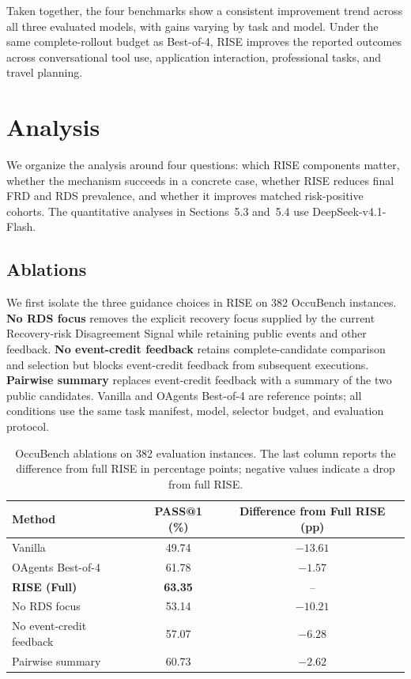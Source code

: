 \documentclass{article}
\begin{document}
Taken together, the four benchmarks show a consistent improvement trend across all three evaluated models, with gains varying by task and model. Under the same complete-rollout budget as Best-of-4, RISE improves the reported outcomes across conversational tool use, application interaction, professional tasks, and travel planning.

\section{Analysis}
We organize the analysis around four questions: which RISE components matter, whether the mechanism succeeds in a concrete case, whether RISE reduces final FRD and RDS prevalence, and whether it improves matched risk-positive cohorts. The quantitative analyses in Sections~5.3 and~5.4 use DeepSeek-v4.1-Flash.

\subsection{Ablations}
We first isolate the three guidance choices in RISE on 382 OccuBench instances. \textbf{No RDS focus} removes the explicit recovery focus supplied by the current Recovery-risk Disagreement Signal while retaining public events and other feedback. \textbf{No event-credit feedback} retains complete-candidate comparison and selection but blocks event-credit feedback from subsequent executions. \textbf{Pairwise summary} replaces event-credit feedback with a summary of the two public candidates. Vanilla and OAgents Best-of-4 are reference points; all conditions use the same task manifest, model, selector budget, and evaluation protocol.

\begin{table}[!htb]
\caption{OccuBench ablations on 382 evaluation instances. The last column reports the difference from full RISE in percentage points; negative values indicate a drop from full RISE.}
\label{tab:ablations}
\centering
\small
\begin{tabular}{lcc}
\toprule
Method & PASS@1 (\%) & Difference from Full RISE (pp) \\
\midrule
Vanilla & 49.74 & $-13.61$ \\
OAgents Best-of-4 & 61.78 & $-1.57$ \\
\textbf{RISE (Full)} & \textbf{63.35} & -- \\
No RDS focus & 53.14 & $-10.21$ \\
No event-credit feedback & 57.07 & $-6.28$ \\
Pairwise summary & 60.73 & $-2.62$ \\
\bottomrule
\end{tabular}
\end{table}
\end{document}
